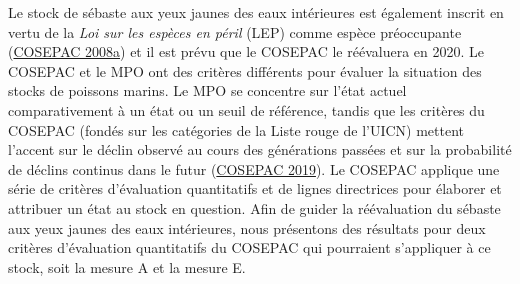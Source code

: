 \documentclass[french,11pt]{book}
\begin{document}
\clearpage

\label{app:cosewic}

Le stock de sébaste aux yeux jaunes des eaux intérieures est également inscrit en vertu de la \emph{Loi sur les espèces en péril} (LEP) comme espèce préoccupante (\protect\hyperlink{ref-cosewic2008}{COSEPAC 2008a}) et il est prévu que le COSEPAC le réévaluera en 2020. Le COSEPAC et le MPO ont des critères différents pour évaluer la situation des stocks de poissons marins. Le MPO se concentre sur l'état actuel comparativement à un état ou un seuil de référence, tandis que les critères du COSEPAC (fondés sur les catégories de la Liste rouge de l'UICN) mettent l'accent sur le déclin observé au cours des générations passées et sur la probabilité de déclins continus dans le futur (\protect\hyperlink{ref-cosewic2015}{COSEPAC 2019}). Le COSEPAC applique une série de critères d'évaluation quantitatifs et de lignes directrices pour élaborer et attribuer un état au stock en question. Afin de guider la réévaluation du sébaste aux yeux jaunes des eaux intérieures, nous présentons des résultats pour deux critères d'évaluation quantitatifs du COSEPAC qui pourraient s'appliquer à ce stock, soit la mesure A et la mesure E.

\hypertarget{mesure-a-du-cosepac}{%
\label{mesure-a-du-cosepac}}
\end{document}
